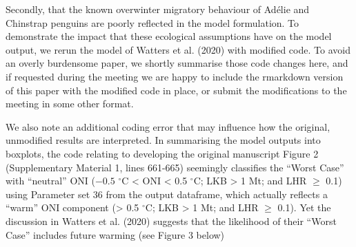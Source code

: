 \documentclass[]{elsarticle} %
\begin{document}
Secondly, that the known overwinter migratory behaviour of Adélie and
Chinstrap penguins are poorly reflected in the model formulation. To
demonstrate the impact that these ecological assumptions have on the
model output, we rerun the model of Watters et al. (2020) with modified
code. To avoid an overly burdensome paper, we shortly summarise those
code changes here, and if requested during the meeting we are happy to
include the rmarkdown version of this paper with the modified code in
place, or submit the modifications to the meeting in some other format.

We also note an additional coding error that may influence how the
original, unmodified results are interpreted. In summarising the model
outputs into boxplots, the code relating to developing the original
manuscript Figure 2 (Supplementary Material 1, lines 661-665) seemingly
classifies the ``Worst Case'' with ``neutral'' ONI (\({-0.5}\)
\(^{\circ}\)C \textless{} ONI \textless{} 0.5 \(^{\circ}\)C; LKB
\textgreater{} 1 Mt; and LHR \(\geqslant\) 0.1) using Parameter set 36
from the output dataframe, which actually reflects a ``warm'' ONI
component (\textgreater{} 0.5 \(^{\circ}\)C; LKB \textgreater{} 1 Mt;
and LHR \(\geqslant\) 0.1). Yet the discussion in Watters et al. (2020)
suggests that the likelihood of their ``Worst Case'' includes future
warming (see Figure 3 below)
\end{document}
